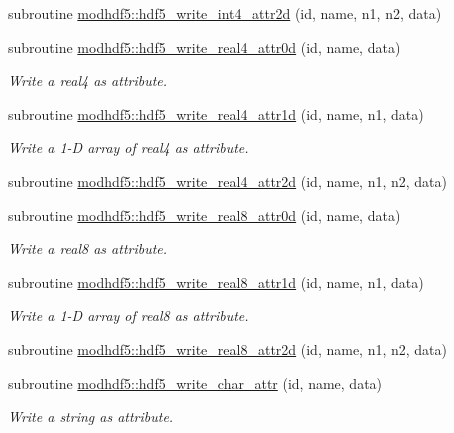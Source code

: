 \begin{DoxyCompactItemize}
subroutine \hyperlink{namespacemodhdf5_a902380b589c35be03e33f0ae8ebdc0dc}{modhdf5\+::hdf5\+\_\+write\+\_\+int4\+\_\+attr2d} (id, name, n1, n2, data)
\item 
subroutine \hyperlink{namespacemodhdf5_abadf683caad48e7acd96f916246bf778}{modhdf5\+::hdf5\+\_\+write\+\_\+real4\+\_\+attr0d} (id, name, data)
\begin{DoxyCompactList}\small\item\em Write a real4 as attribute. \end{DoxyCompactList}\item 
subroutine \hyperlink{namespacemodhdf5_a6158884984b6690aad27d75c6d5f58a7}{modhdf5\+::hdf5\+\_\+write\+\_\+real4\+\_\+attr1d} (id, name, n1, data)
\begin{DoxyCompactList}\small\item\em Write a 1-\/D array of real4 as attribute. \end{DoxyCompactList}\item 
subroutine \hyperlink{namespacemodhdf5_ad682a858bcaec8fcd21f646d44d76208}{modhdf5\+::hdf5\+\_\+write\+\_\+real4\+\_\+attr2d} (id, name, n1, n2, data)
\item 
subroutine \hyperlink{namespacemodhdf5_a28db26cc0b827091ab455d2419c88b10}{modhdf5\+::hdf5\+\_\+write\+\_\+real8\+\_\+attr0d} (id, name, data)
\begin{DoxyCompactList}\small\item\em Write a real8 as attribute. \end{DoxyCompactList}\item 
subroutine \hyperlink{namespacemodhdf5_ad55b7cffc861305840d5f160ba6fa1fd}{modhdf5\+::hdf5\+\_\+write\+\_\+real8\+\_\+attr1d} (id, name, n1, data)
\begin{DoxyCompactList}\small\item\em Write a 1-\/D array of real8 as attribute. \end{DoxyCompactList}\item 
subroutine \hyperlink{namespacemodhdf5_a71ef9213132fb3f757d29f58f9c20966}{modhdf5\+::hdf5\+\_\+write\+\_\+real8\+\_\+attr2d} (id, name, n1, n2, data)
\item 
subroutine \hyperlink{namespacemodhdf5_ad6fea34611cf76b56b5143cd182b8484}{modhdf5\+::hdf5\+\_\+write\+\_\+char\+\_\+attr} (id, name, data)
\begin{DoxyCompactList}\small\item\em Write a string as attribute. \end{DoxyCompactList}\item 

\end{DoxyCompactItemize}
